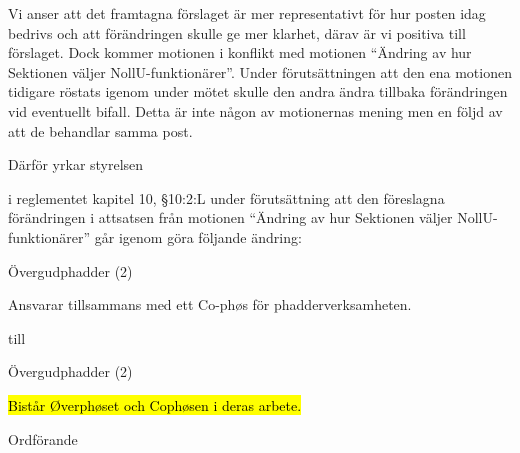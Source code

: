 \documentclass[../_main/handlingar.tex]{subfiles}
\begin{document}
\motionssvar

Vi anser att det framtagna förslaget är mer representativt för hur posten idag bedrivs och att förändringen skulle ge mer klarhet, därav är vi positiva till förslaget. Dock kommer motionen i konflikt med motionen “Ändring av hur Sektionen väljer NollU-funktionärer”. Under förutsättningen att den ena motionen tidigare röstats igenom under mötet skulle den andra ändra tillbaka förändringen vid eventuellt bifall. Detta är inte någon av motionernas mening men en följd av att de behandlar samma post. 


Därför yrkar styrelsen 
\begin{attsatser}
    \att i reglementet kapitel 10, §10:2:L under förutsättning att den föreslagna förändringen i attsatsen från motionen “Ändring av hur Sektionen väljer NollU-funktionärer” går igenom göra följande ändring:
    \par
  \begin{emptylist}
    \item Övergudphadder (2)
      \begin{dashlist}
        \item Ansvarar tillsammans med ett Co-phøs för phadderverksamheten.
      \end{dashlist}
    \end{emptylist}
    
    till 
    
    \begin{emptylist}
        \item Övergudphadder (2)
        \begin{dashlist}
          \item \hl{Bistår Øverphøset och Cophøsen i deras arbete.}
        \end{dashlist}
    \end{emptylist}
  \changenote
\end{attsatser}


\begin{signatures}{1}
    \ist
    \signature{\ordf}{Ordförande}
\end{signatures}
\end{document}
